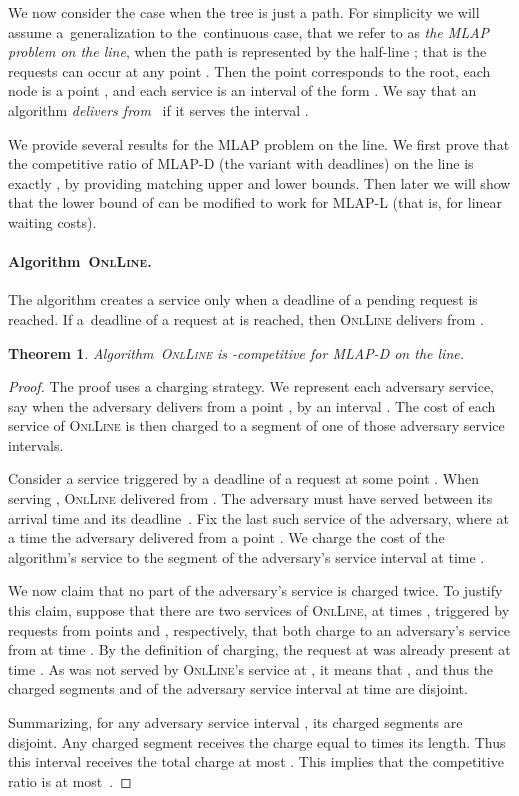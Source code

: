 \documentclass[a4paper]{article}
\newtheorem{theorem}{Theorem}[section]
\newcommand{\DLINE}{\mbox{\textsc{OnlLine}}}
\newcommand{\MLAP}{\mbox{\rm\textsf{MLAP}}}
\newcommand{\MLAPL}{\mbox\rm{\textsf{MLAP-L}}}
\newcommand{\MLAPD}{\mbox{\rm\textsf{MLAP-D}}}
\begin{document}
We now consider the case when the tree is just a path. For simplicity we will
assume a~generalization to the~continuous case, that we refer to as 
\emph{the {\MLAP} problem on the line}, when the path is represented by the half-line
; that is the requests can occur at any point . Then
the point  corresponds to the root, each node is a point ,
and each service is an interval of the form .
We say that an algorithm {\em delivers from}~ if it serves the interval .

We provide several results for the {\MLAP} problem on the line.
We first prove
that the competitive ratio of {\MLAPD} (the variant with deadlines) on
the line is exactly , by providing matching upper and lower
bounds. Then later we will show that the lower bound of  can be
modified to work for {\MLAPL} (that is, for linear waiting costs).


\paragraph{Algorithm~{\DLINE}.}

The algorithm creates a service only when a deadline of a pending request is reached.
If a~deadline of a request at  is reached, then {\DLINE} delivers from .


\begin{theorem}
Algorithm~{\DLINE} is -competitive for {\MLAPD} on the line.
\end{theorem}

\begin{proof}
The proof uses a charging strategy. We represent each adversary service, say when the 
adversary delivers from a point , by an interval . The cost of each
service of {\DLINE} is then charged to a segment of one of those adversary service intervals.

Consider a service triggered by a deadline  of a request  at some point .
When serving , {\DLINE} delivered from .
The adversary must have served  between its arrival time and its
deadline~. Fix the last such service of the adversary, where at a time  the
adversary delivered from a point . We charge the
cost  of the algorithm's service to the segment  of the
adversary's service interval  at time . 

We now claim that no part of the adversary's service is charged twice.
To justify this claim, suppose that there are two services of {\DLINE}, at 
times , triggered by requests from points  and , respectively, 
that both charge to an adversary's service from  at time . 
By the definition of charging, the request at  was 
already present at time . As  was not served 
by {\DLINE}'s service at , it means that , and thus
the charged segments  and  of the adversary service
interval at time  are disjoint.

Summarizing, for any adversary service interval , its charged
segments are disjoint. Any charged segment receives the charge equal to
 times its length. Thus this interval receives the total charge
at most . This implies that the competitive ratio is at most~.
\end{proof}
\end{document}
